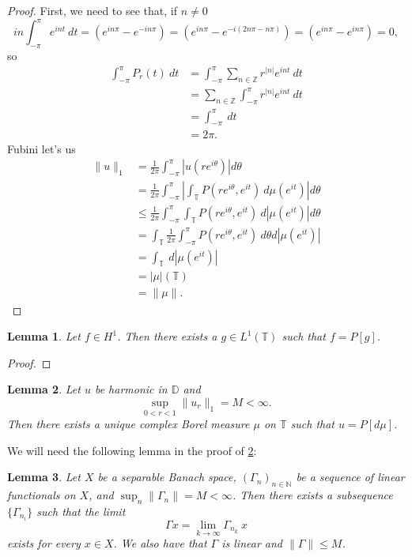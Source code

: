 \documentclass[a4paper,12pt,twoside,BCOR=10mm]{scrbook}
\newtheorem{lemma}{Lemma}
\begin{document}
\begin{proof}
First, we need to see that, if $n \neq 0$
\[
	in\int_{-\pi}^{\pi} e^{int}\ dt
	= (e^{in\pi} - e^{-in\pi})
	= (e^{in\pi} - e^{-i(2n\pi - n\pi)})
	= (e^{in\pi} - e^{in\pi})
	= 0,
\]
so
\begin{align*}
	\int_{-\pi}^{\pi} P_r(t)\ dt
	&= \int_{-\pi}^{\pi} \sum_{n \in \mathbb{Z}} r^{|n|}e^{int}\ dt\\
	&= \sum_{n \in \mathbb{Z}} \int_{-\pi}^{\pi} r^{|n|}e^{int}\ dt\\
	&= \int_{-\pi}^{\pi} \ dt\\
	&= 2\pi.
\end{align*}
Fubini let's us
\begin{align*}
	\|u\|_1
	&= \frac{1}{2\pi} \int_{-\pi}^{\pi} |u(re^{i\theta})| d\theta\\
	&= \frac{1}{2\pi} \int_{-\pi}^{\pi} \left | \int_{\mathbb{T}} P(re^{i\theta}, e^{it})\ d\mu(e^{it}) \right | d\theta\\
	&\leq \frac{1}{2\pi} \int_{-\pi}^{\pi} \int_{\mathbb{T}} P(re^{i\theta}, e^{it})\ d|\mu(e^{it})| d\theta\\
	&= \int_{\mathbb{T}} \frac{1}{2\pi} \int_{-\pi}^{\pi} P(re^{i\theta}, e^{it})\ d\theta d|\mu(e^{it})|\\
	&= \int_{\mathbb{T}}\ d|\mu(e^{it})|\\
	&= |\mu|(\mathbb{T})\\
	&= \|\mu\|.
\end{align*}
\end{proof}
\begin{lemma}
\label{FMRlemma2}
Let $f \in H^1$.
Then there exists a $g \in L^1(\mathbb{T})$ such that $f = P[g]$.
\end{lemma}
\begin{proof}
\end{proof}
\begin{lemma}
\label{FMRlemma3}
Let $u$ be harmonic in $\mathbb{D}$ and
\[
	\sup_{0 < r < 1} \|u_r\|_1 = M < \infty. %
\]
Then there exists a unique complex Borel measure $\mu$ on $\mathbb{T}$ such that $u = P[d\mu]$.
\end{lemma}
We will need the following lemma in the proof of \ref{FMRlemma3}:
\begin{lemma}
\label{FMRlemma31}
Let $X$ be a separable Banach space,
	$(\Gamma_n)_{n \in \mathbb{N}}$ be a sequence of linear functionals on $X$,
	and $\sup_n \|\Gamma_n\| = M < \infty$.
Then there exists a subsequence $\{\Gamma_{n_i}\}$ such that the limit 
\[
	\Gamma x = \lim_{k \rightarrow \infty} \Gamma_{n_k}\ x
\]
exists for every $x \in X$.
We also have that $\Gamma$ is linear and $\|\Gamma\| \leq M$.
\end{lemma}
\end{document}
